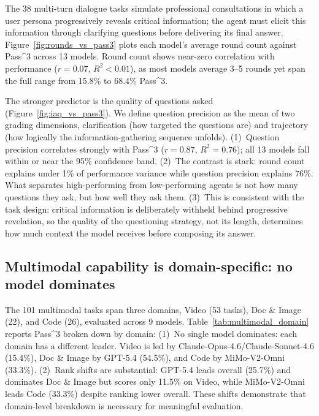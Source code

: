 \documentclass{article}
\begin{document}
The 38 multi-turn dialogue tasks simulate professional consultations in which a user persona progressively reveals critical information; the agent must elicit this information through clarifying questions before delivering its final answer. Figure~\ref{fig:rounds_vs_pass3} plots each model's average round count against Pass\textasciicircum{}3 across 13 models. Round count shows near-zero correlation with performance ($r = 0.07$, $R^2 < 0.01$), as most models average 3--5 rounds yet span the full range from 15.8\% to 68.4\% Pass\textasciicircum{}3.


The stronger predictor is the quality of questions asked (Figure~\ref{fig:iaq_vs_pass3}). We define question precision as the mean of two grading dimensions, clarification (how targeted the questions are) and trajectory (how logically the information-gathering sequence unfolds).
(1)~Question precision correlates strongly with Pass\textasciicircum{}3 ($r = 0.87$, $R^2 = 0.76$); all 13 models fall within or near the 95\% confidence band.
(2)~The contrast is stark: round count explains under 1\% of performance variance while question precision explains 76\%. What separates high-performing from low-performing agents is not how many questions they ask, but how well they ask them.
(3)~This is consistent with the task design: critical information is deliberately withheld behind progressive revelation, so the quality of the questioning strategy, not its length, determines how much context the model receives before composing its answer.


\subsection{Multimodal capability is domain-specific: no model dominates}
\label{sec:multimodal_analysis}

The 101 multimodal tasks span three domains, Video (53 tasks), Doc \& Image (22), and Code (26), evaluated across 9 models. Table~\ref{tab:multimodal_domain} reports Pass\textasciicircum{}3 broken down by domain:
(1)~No single model dominates: each domain has a different leader. Video is led by Claude-Opus-4.6/Claude-Sonnet-4.6 (15.4\%), Doc \& Image by GPT-5.4 (54.5\%), and Code by MiMo-V2-Omni (33.3\%).
(2)~Rank shifts are substantial: GPT-5.4 leads overall (25.7\%) and dominates Doc \& Image but scores only 11.5\% on Video, while MiMo-V2-Omni leads Code (33.3\%) despite ranking lower overall.
These shifts demonstrate that domain-level breakdown is necessary for meaningful evaluation.
\end{document}
